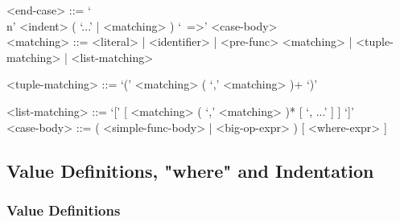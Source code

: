 \documentclass{article}
\begin{document}
\begin{itemize}
\begin{grammar}
<end-case> ::=
`\\n' <indent> ( `...' | <matching> ) `\ =>' <case-body>\\

<matching> ::= 
<literal> | <identifier> | <pre-func> <matching> | <tuple-matching> |
<list-matching>

<tuple-matching> ::= `(' <matching> ( `,' <matching> )+ `)'

<list-matching> ::= `[' [ <matching> ( `,' <matching> )* [ `, ...' ] ] `]' \\


<case-body> ::=
( <simple-func-body> | <big-op-expr> ) [ <where-expr> ]
\end{grammar}

\end{itemize}

\subsection{Value Definitions, "where" and Indentation}
\label{subsec:valdefswhere}

\subsubsection{Value Definitions}
\label{subsubsec:valdefs}
\end{document}
